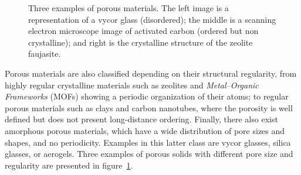 \documentclass[thesis]{subfiles}
\begin{document}
\begin{figure}[ht]
    \centering
    \hfill
    \hfill
    \caption{Three examples of porous materials. The left image is a
    representation of a vycor glass (disordered)\cite{Levitz2003}; the middle
    is a scanning electron microscope image of activated carbon (ordered but non
    crystalline)\cite{Das2015}; and right is the crystalline structure of the
    zeolite faujasite.}
    \label{fig:porous-examples}
\end{figure}

Porous materials are also classified depending on their structural regularity,
from highly regular crystalline materials such as zeolites and
\emph{Metal--Organic Frameworks} (MOFs) showing a periodic organization of their
atoms; to regular porous materials such as clays and carbon nanotubes, where the
porosity is well defined but does not present long-distance ordering. Finally,
there also exist amorphous porous materials, which have a wide distribution of
pore sizes and shapes, and no periodicity. Examples in this latter class are
vycor glasses, silica glasses, or aerogels. Three examples of porous solids with
different pore size and regularity are presented in figure~\ref{fig:porous-examples}.
\end{document}
